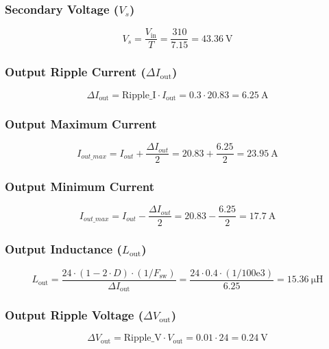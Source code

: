 \subsubsection*{Secondary Voltage (\(V_s\))}
\begin{equation}
V_s = \frac{V_{\text{in}}}{T} = \frac{310}{7.15} = \boxed{\SI{43.36}{\volt}}
\end{equation}

\subsubsection*{Output Ripple Current (\(\Delta I_{\text{out}}\))}
\begin{equation}
\Delta I_{\text{out}} = \text{Ripple\_I} \cdot I_{\text{out}} = 0.3 \cdot 20.83 = \boxed{\SI{6.25}{\ampere}}
\end{equation}

\subsubsection*{Output Maximum Current}
\begin{equation}
I_{out\_max} = I_{out} + \frac{\Delta I_{out}}{2} = 20.83 + \frac{6.25}{2} = \boxed{\SI{23.95}{\ampere}}    
\end{equation}

\subsubsection*{Output Minimum Current}
\begin{equation}
I_{out\_max} = I_{out} - \frac{\Delta I_{out}}{2} = 20.83 - \frac{6.25}{2} = \boxed{\SI{17.7}{\ampere}}    
\end{equation}

\subsubsection*{Output Inductance (\(L_{\text{out}}\))}
\begin{equation}
L_{\text{out}} = \frac{24 \cdot (1 - 2 \cdot D) \cdot (1/F_{\text{sw}})}{\Delta I_{\text{out}}} = \frac{24 \cdot 0.4 \cdot (1/100\text{e}3)}{6.25} = \boxed{\SI{15.36}{\micro\henry}}
\end{equation}

\subsubsection*{Output Ripple Voltage (\(\Delta V_{\text{out}}\))}
\begin{equation}
\Delta V_{\text{out}} = \text{Ripple\_V} \cdot V_{\text{out}} = 0.01 \cdot 24 = \boxed{\SI{0.24}{\volt}}
\end{equation}

